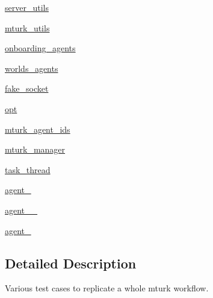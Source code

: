 \begin{DoxyCompactItemize}
\item 
\hyperlink{classparlai_1_1mturk_1_1core_1_1test_1_1test__full__system_1_1TestMTurkManagerWorkflows_afa078bb56be8ac4d01aa38fc0861b687}{server\+\_\+utils}
\item 
\hyperlink{classparlai_1_1mturk_1_1core_1_1test_1_1test__full__system_1_1TestMTurkManagerWorkflows_afed3c36508990d5ab2eab8d811bced2d}{mturk\+\_\+utils}
\item 
\hyperlink{classparlai_1_1mturk_1_1core_1_1test_1_1test__full__system_1_1TestMTurkManagerWorkflows_a32f07af709d256073c518e6b23c4456f}{onboarding\+\_\+agents}
\item 
\hyperlink{classparlai_1_1mturk_1_1core_1_1test_1_1test__full__system_1_1TestMTurkManagerWorkflows_a6cf257dadd71b7c7a6b559bb3402a713}{worlds\+\_\+agents}
\item 
\hyperlink{classparlai_1_1mturk_1_1core_1_1test_1_1test__full__system_1_1TestMTurkManagerWorkflows_a8218c6c57f225e897da3596ca9888bc4}{fake\+\_\+socket}
\item 
\hyperlink{classparlai_1_1mturk_1_1core_1_1test_1_1test__full__system_1_1TestMTurkManagerWorkflows_af2d2b236e15533fb486ec5cc3c674622}{opt}
\item 
\hyperlink{classparlai_1_1mturk_1_1core_1_1test_1_1test__full__system_1_1TestMTurkManagerWorkflows_a877e71e7eed80c56b447ecacf5c97224}{mturk\+\_\+agent\+\_\+ids}
\item 
\hyperlink{classparlai_1_1mturk_1_1core_1_1test_1_1test__full__system_1_1TestMTurkManagerWorkflows_a93e0d9b889cf71ac938b0c6bd0b92f56}{mturk\+\_\+manager}
\item 
\hyperlink{classparlai_1_1mturk_1_1core_1_1test_1_1test__full__system_1_1TestMTurkManagerWorkflows_ae239124c6259a94b9ce9d139df9a1046}{task\+\_\+thread}
\item 
\hyperlink{classparlai_1_1mturk_1_1core_1_1test_1_1test__full__system_1_1TestMTurkManagerWorkflows_ae071486e5e25e03d3c44d3fb90b27250}{agent\+\_}
\item 
\hyperlink{classparlai_1_1mturk_1_1core_1_1test_1_1test__full__system_1_1TestMTurkManagerWorkflows_a02b3f38074cfbe02ac90168f5010dd67}{agent\+\_\+\_}
\item 
\hyperlink{classparlai_1_1mturk_1_1core_1_1test_1_1test__full__system_1_1TestMTurkManagerWorkflows_a5993b5a9f57d34ea6f577d670fdadd9a}{agent\+\_}
\end{DoxyCompactItemize}


\subsection{Detailed Description}
\begin{DoxyVerb}Various test cases to replicate a whole mturk workflow.
\end{DoxyVerb}
 

